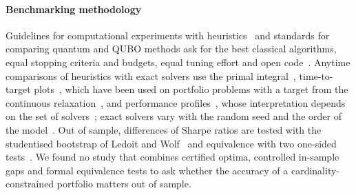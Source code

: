 \paragraph{Benchmarking methodology} Guidelines for computational experiments with heuristics~\cite{barr1995designing}
and standards for comparing quantum and QUBO methods ask for the best classical algorithms, equal stopping criteria and
budgets, equal tuning effort and open code~\cite{ronnow2014defining,dunning2018what,bucher2024towards,koch2026quantum}.
Anytime comparisons of heuristics with exact solvers use the primal integral~\cite{berthold2013measuring,berthold2020confined},
time-to-target plots~\cite{aiex2006ttt}, which have been used on portfolio problems with a target from the continuous
relaxation~\cite{rubiogarcia2022portfolio}, and performance profiles~\cite{dolan2002benchmarking}, whose interpretation
depends on the set of solvers~\cite{gould2016note}; exact solvers vary with the random seed and the order of the
model~\cite{lodi2013performance}. Out of sample, differences of Sharpe ratios are tested with the studentised bootstrap of
Ledoit and Wolf~\cite{ledoit2008robust} and equivalence with two one-sided tests~\cite{schuirmann1987comparison,lakens2017equivalence}.
We found no study that combines certified optima, controlled in-sample gaps and formal equivalence tests to ask whether
the accuracy of a cardinality-constrained portfolio matters out of sample.

